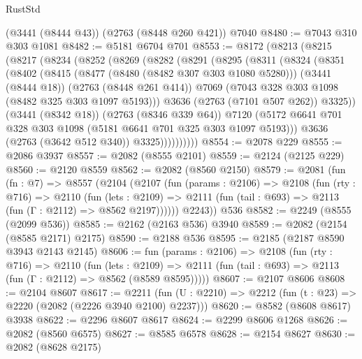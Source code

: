 \begin{lexlean}{RustStd}
\begin{coremodule}
    (@3441 (@8444 @43))
    (@2763 (@8448 @260 @421))
    @7040
@8480 := @7043 @310 @303 @1081
@8482 := @5181 @6704 @701
@8553 := @8172
    (@8213
      (@8215
        (@8217
          (@8234
            (@8252
              (@8269
                (@8282
                  (@8291
                    (@8295
                      (@8311
                        (@8324
                          (@8351
                            (@8402
                              (@8415
                                (@8477 (@8480 (@8482 @307 @303 @1080 @5280)))
                                (@3441 (@8444 @18))
                                (@2763 (@8448 @261 @414))
                                @7069
                                (@7043 @328 @303 @1098 (@8482 @325 @303 @1097 @5193)))
                              @3636
                              (@2763 (@7101 @507 @262))
                              @3325))
                          (@3441 (@8342 @18))
                          (@2763 (@8346 @339 @64))
                          @7120
                          (@5172
                            @6641
                            @701
                            @328
                            @303
                            @1098
                            (@5181 @6641 @701 @325 @303 @1097 @5193)))
                        @3636
                        (@2763 (@3642 @512 @340))
                        @3325))))))))))
@8554 := @2078 @229
@8555 := @2086 @3937
@8557 := @2082 (@8555 @2101)
@8559 := @2124 (@2125 @229)
@8560 := @2120 @8559
@8562 := @2082 (@8560 @2150)
@8579 := @2081
    (fun (fn : @7) =>
    @8557
      (@2104
        (@2107
          (fun (params : @2106) =>
          @2108
            (fun (rty : @716) =>
            @2110
              (fun (lets : @2109) =>
              @2111 (fun (tail : @693) => @2113 (fun (Γ : @2112) => @8562 @2197))))))
        @2243))
    @536
@8582 := @2249 (@8555 (@2099 @536))
@8585 := @2162 (@2163 @536) @3940
@8589 := @2082 (@2154 (@8585 @2171) @2175)
@8590 := @2188 @536
@8595 := @2185 (@2187 @8590 @3943 @2143 @2145)
@8606 := fun (params : @2106) =>
  @2108
    (fun (rty : @716) =>
    @2110
      (fun (lets : @2109) =>
      @2111 (fun (tail : @693) => @2113 (fun (Γ : @2112) => @8562 (@8589 @8595)))))
@8607 := @2107 @8606
@8608 := @2104 @8607
@8617 := @2211 (fun (U : @2210) => @2212 (fun (t : @23) => @2220 (@2082 (@2226 @3940 @2100) @2237)))
@8620 := @8582 (@8608 @8617) @3938
@8622 := @2296 @8607 @8617
@8624 := @2299 @8606 @1268
@8626 := @2082 (@8560 @6575)
@8627 := @8585 @6578
@8628 := @2154 @8627
@8630 := @2082 (@8628 @2175)

\end{coremodule}
\end{lexlean}
